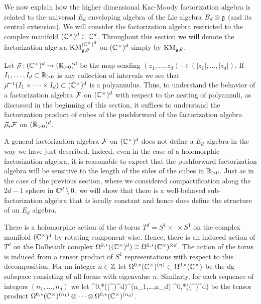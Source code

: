 \documentclass[10pt]{amsart}
\def\KM{{\rm KM}}
\begin{document}
\subsubsection{}
We now explain how the higher dimensional Kac-Moody factorization algebra is related to the universal $E_d$ enveloping algebra of the Lie algebra $B_d \otimes \mathfrak g$ (and its central extension). We will consider the factorization algebra restricted to the complex manifold $(\mathbb C^\times)^d \subset \mathbb C^d$. Throughout this section we will denote the factorization algebra $\KM^{(\CC^\times)^d}_{\fg, \theta}$ on $(\mathbb C^\times)^d$ simply by $\KM_{\fg,\theta}$. 

Let $\vec{\rho} : (\mathbb C^\times)^d \to (\mathbb R_{>0})^d$ be the map sending $(z_1,\ldots,z_d) \mapsto (|z_1|, \ldots, |z_d|)$. If $I_1,\ldots,I_d \subset \mathbb R_{>0}$ is any collection of intervals we see that $\vec{\rho}^{-1}(I_1\times \cdots \times I_d) \subset (\mathbb C^\times)^d$ is a polyannulus. Thus, to understand the behavior of a factorization algebra $\mathcal F$ on $(\mathbb C^\times)^d$ with respect to the nesting of polyannuli, as discussed in the beginning of this section, it suffices to understand the factorization product of cubes of the pushforward of the factorization algebra $\vec{\rho}_* \mathcal F$ on $(\mathbb R_{>0})^d$. 

A general factorization algebra $\mathcal F$ on $(\mathbb C^\times)^d$ does not define a $E_d$ algebra in the way we have just described. Indeed, even in the case of a holomorphic factorization algebra, it is reasonable to expect that the pushforward factorization algebra will be sensitive to the length of the sides of the cubes in $\mathbb R_{>0}$. Just as in the case of the previous section, where we considered compactification along the $2d-1$ sphere in $\mathbb C^d \setminus 0$, we will show that there is a well-behaved sub-factorization algebra that {\em is} locally constant and hence does define the structure of an $E_d$ algebra. 

There is a holomorphic action of the $d$-torus $T^d = S^1 \times \cdot \times S^1$ on the complex manifold $(\mathbb C^\times)^d$ by rotating component-wise. Hence, there is an induced action of $T^d$ on the Dolbeault complex $\Omega^{0,*}((\mathbb C^\times)^d) \cong \Omega^{0,*}(\mathbb C^{\times})^{\otimes d}$. The action of the torus is induced from a tensor product of $S^1$ representations with respect to this decomposition. For an integer $n \in \mathbb Z$ let $\Omega^{0,*}(\mathbb C^\times)^{(n)} \subset \Omega^{0,*}(\mathbb C^\times)$ be the dg subspace consisting of all forms with eigenvalue $n$. Similarly, for each sequence of integers $(n_1,\ldots,n_d)$ we let
\ben
\Omega^{0,*}\left((\CC^{\times})^d\right)^{(n_1,\ldots,n_d)} \subset \Omega^{0,*}\left((\CC^{\times})^d\right)
\een 
be the tensor product $\Omega^{0,*}(\mathbb C^\times)^{(n_1)} \otimes \cdots \otimes \Omega^{0,*}(\mathbb C^\times)^{(n_d)}$. 
\end{document}

